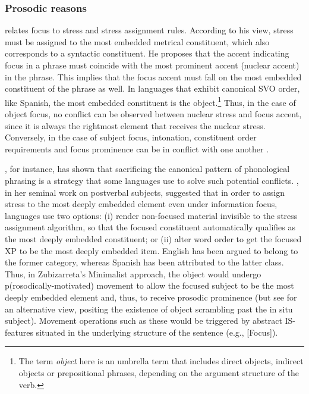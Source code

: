 \subsubsection{Prosodic reasons}
    
\textcite{cinque1993null} relates focus to stress and stress assignment rules.  According to his view, stress must be assigned to the most embedded metrical constituent, which also corresponds to a syntactic constituent. He proposes that the accent indicating focus in a phrase must coincide with the most prominent accent (nuclear accent) in the phrase. This implies that the focus accent must fall on the most embedded constituent of the phrase as well. In languages that exhibit canonical SVO order, like Spanish, the most embedded constituent is the object.\footnote {The term \textit{object} here is an umbrella term that includes direct objects, indirect objects or prepositional phrases, depending on the argument structure of the verb.} Thus, in the case of object focus, no conflict can be observed between nuclear stress and focus accent, since it is always the rightmost element that receives the nuclear stress. Conversely, in the case of subject focus, intonation, constituent order requirements and focus prominence can be in conflict with one another \parencite{selkirk1995sentence, truckenbrodt1999relation}.

\textcite{truckenbrodt1999relation}, for instance, has shown that sacrificing the canonical pattern of phonological phrasing is a strategy that some languages use to solve such potential conflicts.
\textcite{zubizarreta1998prosody}, in her seminal work on postverbal subjects, suggested that in order to assign stress to the most deeply embedded element even under information focus, languages use two options: (i) render non-focused material invisible to the stress assignment algorithm, so that the focused constituent automatically qualifies as the most deeply embedded constituent; or (ii) alter word order to get the focused XP to be the most deeply embedded item. English has been argued to belong to the former category, whereas Spanish has been attributed to the latter class. Thus, in Zubizarreta's Minimalist approach, the  object  would  undergo p(rosodically-motivated) movement to allow the focused subject to be the most deeply embedded element and, thus, to receive prosodic prominence (but see \cite{ordonez2000clausal} for an alternative view, positing the existence of object scrambling past the in situ subject). Movement operations such as these would be triggered by abstract IS-features situated in the underlying structure of the sentence (e.g., [Focus]).

